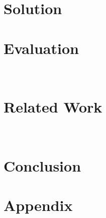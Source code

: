\section{Solution}

%
\section{Evaluation}~\label{sec:eval}

%
\vspace{-3em}
\section{Related Work}~\label{sec:related}


\section{Conclusion}










\newpage
\section{Appendix}




